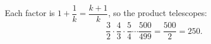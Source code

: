Each factor is $1+\dfrac{1}{k}=\dfrac{k+1}{k}$, so the product telescopes:
\[
\dfrac{3}{2}\cdot\dfrac{4}{3}\cdot\dfrac{5}{4}\cdots\dfrac{500}{499}=\dfrac{500}{2}=\boxed{250}.
\]
